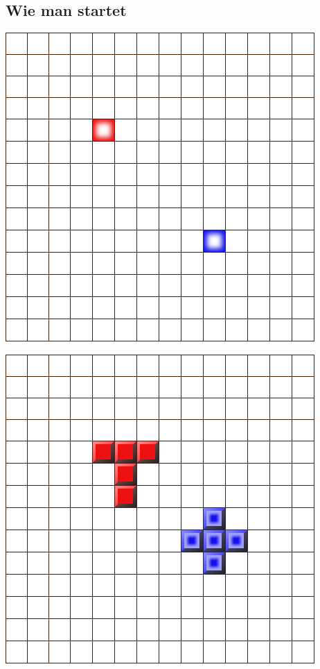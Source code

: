 \documentclass[12pt]{beamer}
\begin{document}
\subsection{Wie man startet}
\begin{frame}
	\includegraphics[width=0.8\linewidth]{media/how2play0.png}
\end{frame}
\begin{frame}
	\includegraphics[width=0.8\linewidth]{media/how2play1.png}
\end{frame}
\end{document}
